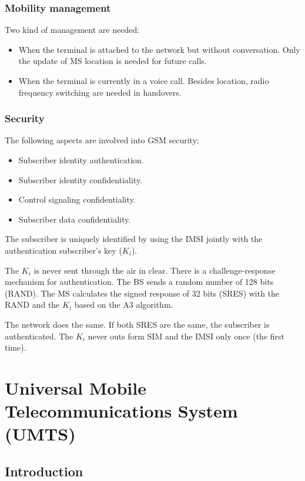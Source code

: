 \documentclass[../main.tex]{subfiles}
\begin{document}
\subsubsection{Mobility management}

Two kind of management are needed:
\begin{itemize}
	\item When the terminal is attached to the network but without conversation. Only the update of MS location is needed for future calls.
	\item When the terminal is currently in a voice call. Besides location, radio frequency switching are needed in handovers.
\end{itemize}

\subsubsection{Security}

The following aspects are involved into GSM security:
\begin{itemize}
	\item Subscriber identity authentication.
	\item Subscriber identity confidentiality.
	\item Control signaling confidentiality.
	\item Subscriber data confidentiality.
\end{itemize}

The subscriber is uniquely identified by using the IMSI jointly with the authentication subscriber's key ($K_i$).

The $K_i$ is never sent through the air in clear. There is a challenge-response mechanism for authentication. The BS sends a random number of 128 bits (RAND). The MS calculates the signed response of 32 bits (SRES) with the RAND and the $K_i$ based on the A3 algorithm.

The network does the same. If both SRES are the same, the subscriber is authenticated. The $K_i$ never outs form SIM and the IMSI only once (the first time).

\section{Universal Mobile Telecommunications System (UMTS)}

\subsection{Introduction}
\end{document}
